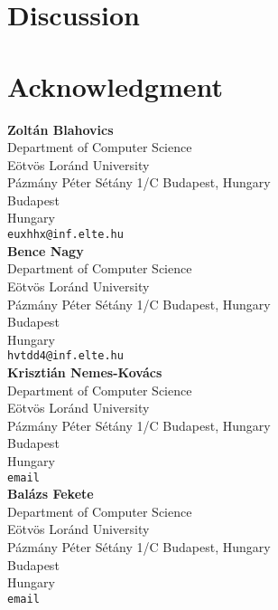 \documentclass[10pt,leqno,twoside]{article}
\begin{document}



\section{Discussion} %



\section*{Acknowledgment}



\printbibliography[title=References]


\clearpage
\vspace{2cm}

\noindent\textbf{Zoltán Blahovics}\\
Department of Computer Science\\Eötvös Loránd University\\Pázmány Péter Sétány 1/C Budapest, Hungary\\
Budapest\\
Hungary\\
{\tt euxhhx@inf.elte.hu}\\

\noindent\textbf{Bence Nagy}\\
Department of Computer Science\\Eötvös Loránd University\\Pázmány Péter Sétány 1/C Budapest, Hungary\\
Budapest\\
Hungary\\
{\tt hvtdd4@inf.elte.hu}\\

\noindent\textbf{Krisztián Nemes-Kovács}\\
Department of Computer Science\\Eötvös Loránd University\\Pázmány Péter Sétány 1/C Budapest, Hungary\\
Budapest\\
Hungary\\
{\tt email}\\

\noindent\textbf{Balázs Fekete}\\
Department of Computer Science\\Eötvös Loránd University\\Pázmány Péter Sétány 1/C Budapest, Hungary\\
Budapest\\
Hungary\\
{\tt email}\\
\end{document}
